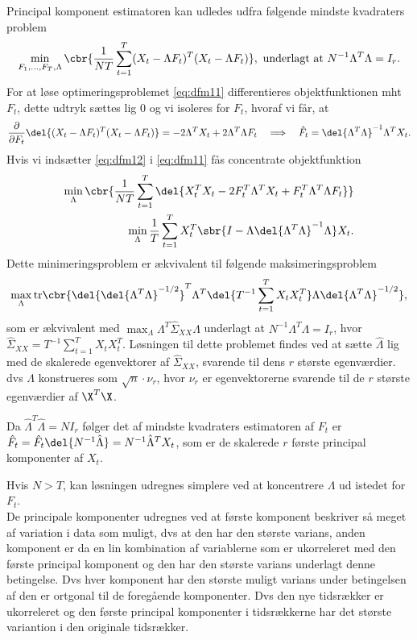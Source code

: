 Principal komponent estimatoren kan udledes udfra følgende mindste kvadraters problem
\begin{align}
\min_{F_1,\ldots,F_T, \Lambda} \cbr{\frac{1}{NT} \sum_{t=1}^T(X_t-\Lambda F_t)^T(X_t - \Lambda F_t)}, \ \text{underlagt at } N^{-1} \Lambda^T \Lambda = I_r. \label{eq:dfm11}
\end{align}
For at løse optimeringsproblemet \eqref{eq:dfm11} differentieres objektfunktionen mht \(F_t\), dette udtryk sættes lig 0 og vi isoleres for \(F_t\), hvoraf vi får, at
\begin{align}
\frac{\partial}{\partial F_t} \del{(X_t-\Lambda F_t)^T(X_t - \Lambda F_t)} = -2 \Lambda^T X_t + 2 \Lambda^T \Lambda F_t \quad \Longrightarrow \quad \hat{F}_t = \del{\Lambda^T \Lambda}^{-1} \Lambda^T X_t. \label{eq:dfm12}
\end{align}
Hvis vi indsætter \eqref{eq:dfm12} i \eqref{eq:dfm11} fås concentrate objektfunktion
\begin{align*}
\min_{\Lambda} \cbr{\frac{1}{NT} \sum_{t=1}^T \del{X_t^T X_t - 2 F_t^T \Lambda^T X_t + F_t^T \Lambda^T \Lambda F_t}} \\
\min_\Lambda \frac{1}{T} \sum_{t=1}^T X_t^T \sbr{I- \Lambda \del{\Lambda^T \Lambda}^{-1} \Lambda} X_t.
\end{align*}
Dette minimeringsproblem er ækvivalent til følgende maksimeringsproblem
\begin{align*}
\max_\Lambda \text{tr} \cbr{\del{\del{\Lambda^T \Lambda}^{-1/2}}^T \Lambda^T \del{T^{-1} \sum_{t=1}^T X_t X_t^T} \Lambda \del{\Lambda^T \Lambda}^{-1/2}},
\end{align*}
som er ækvivalent med $\max_\Lambda \Lambda^T \hat{\Sigma}_{XX} \Lambda$ underlagt at $N^{-1} \Lambda^T \Lambda=I_r$, hvor $\hat{\Sigma}_{XX}=T^{-1} \sum_{t=1}^T X_t X_t^T$.
Løsningen til dette problemet findes ved at sætte \(\hat{\Lambda}\) lig med de skalerede egenvektorer af \(\hat{\Sigma}_{XX}\), svarende til dens \(r\) største egenværdier.
dvs \(\Lambda\) konstrueres som \(\sqrt{n} \cdot \nu_r\), hvor \(\nu_r\) er egenvektorerne svarende til de \(r\) største egenværdier af \(\X^T \X\).

Da $\hat{\Lambda}^T \hat{\Lambda}=N I_r$ følger det af mindste kvadraters estimatoren af $F_t$ er $\hat{F}_t=\hat{F}_t \del{N^{-1}\hat{\Lambda}}=N^{-1}\hat{\Lambda}^TX_t$, som er de skalerede $r$ første principal komponenter af $X_t$. 

Hvis \(N > T\), kan løsningen udregnes simplere ved at koncentrere \(\Lambda\) ud istedet for \(F_t\).
%
\\[4mm]
%
%
De principale komponenter udregnes ved at første komponent beskriver så meget af variation i data som muligt, dvs at den har den største varians, anden komponent er da en lin kombination af variablerne som er ukorreleret med den første principal komponent og den har den største varians underlagt denne betingelse.
Dvs hver komponent har den største muligt varians under betingelsen af den er ortgonal til de foregående komponenter.
Dvs den nye tidsrækker er ukorreleret og den første principal komponenter i tidsrækkerne har det største variantion i den originale tidsrækker.


